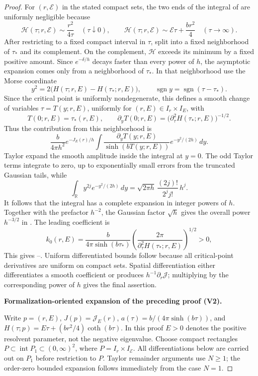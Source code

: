 \documentclass[11pt]{article}
\newcommand{\formalisationparentid}{X}
\newenvironment{formalisationaddition}[1]{\par\medskip\begingroup\color{blue}\def\formalisationparentid{#1}\setcounter{formalizationsublemma}{0}\let\lemma\formalizationsublemma\let\endlemma\endformalizationsublemma
  \def\Eo{\mathcal E_h^\circ}\def\EE{\mathcal E_h}\def\phio{\phi_h^\circ}\def\phih{\phi_h}\def\Ho{H_h^{\rm atom}(v^\circ)}\def\Ha{H_h^{\rm atom}}\def\HL{H_h^{L}}\def\Dh{D_h}\def\Log{\operatorname{Log}}\def\ellh{\ell_h}\def\Gp{G_{p,h}}\def\Ast{A_{*,h}}\def\ahat{\widehat{\mathfrak a}_h}\def\ah{\mathfrak a_h}\def\rh{\widehat\rho_h}\def\deltah{\widehat\delta_h}\def\oldref##1{\textup{(##1)}}\def\interface##1{\par\noindent\textit{Analytical interface used here.} ##1\par}\def\finish{\par\noindent\textit{Conclusion of the formalization-oriented expansion.} }\par\noindent\textbf{Formalization-oriented expansion of the preceding proof (V2).}\par\smallskip
}{\par\endgroup\medskip
}
\newcommand{\cE}{\mathcal E}
\newcommand{\cJ}{\mathcal J}
\begin{document}
\begin{proof}
For $(r,\cE)$ in the stated compact sets, the two ends of the integral {of } are uniformly negligible because
\[
 \mathcal H(\tau;r,\cE)\sim \frac{r^2}{4\tau}
 \quad (\tau\downarrow0),
 \qquad
 \mathcal H(\tau;r,\cE)\sim \cE\tau+\frac{br^2}{4}
 \quad (\tau\to\infty).
\]
After restricting to a fixed compact interval in $\tau$, split  into a fixed neighborhood of $\tau_*$ and its complement.  On the complement, $\mathcal H$ exceeds its minimum by a fixed positive amount.  Since $e^{-\delta/h}$ decays faster than every power of $h$, the asymptotic expansion comes only from a neighborhood of $\tau_*$.  In that neighborhood use the Morse coordinate
\[
    y^2=2\bigl(H(\tau;r,E)-H(\tau_*;r,E)\bigr),
    \qquad {\operatorname{sgn} y=\operatorname{sgn}(\tau-\tau_*)}.
\]
{ Since the critical point is uniformly nondegenerate, this defines a
smooth change of variables $\tau=T(y;r,E)$, uniformly for
$(r,E)\in I_r\times I_E$, with
\[
    T(0;r,E)=\tau_*(r,E),
    \qquad
    \partial_y T(0;r,E)
    =\bigl(\partial_\tau^2H(\tau_*;r,E)\bigr)^{-1/2}.
\]
Thus the contribution from this neighborhood is
\[
 \frac{b}{4\pi h^2}e^{-J_E(r)/h}
 \int
 \frac{\partial_yT(y;r,E)}
      {\sinh(bT(y;r,E))}
 e^{-y^2/(2h)}\,dy.
\]
Taylor expand the smooth amplitude inside the integral at  $y=0$.  The odd Taylor terms integrate to zero, up to exponentially
small errors from the truncated Gaussian tails, while
\[
 \int_{\mathbb R} y^{2j}e^{-y^2/(2h)}\,dy
 = \sqrt{2\pi h}\,\frac{(2j)!}{2^j j!}\,h^j.
\]
It follows that the integral has a complete expansion in integer powers
of $h$.  Together with the prefactor $h^{-2}$, the Gaussian factor
$\sqrt h$ gives the overall power $h^{-3/2}$ in .  The
leading coefficient is
\[
 k_0(r,E)
 =\frac{b}{4\pi\sinh(b\tau_*)}
   \left(
      \frac{2\pi}
           {\partial_\tau^2H(\tau_*;r,E)}
   \right)^{1/2}>0,
\]
This} gives --.  Uniform differentiated bounds follow because all critical-point derivatives are uniform on compact sets.  Spatial differentiation either differentiates a smooth coefficient or produces $h^{-1}\partial_r\cJ$; multiplying by the corresponding power of $h$ gives the final assertion.

\begin{formalisationaddition}{P2.3}
Write $p=(r,E)$, $J(p)=\cJ_E(r)$,
$a(\tau)=b/(4\pi\sinh(b\tau))$, and
$H(\tau;p)=E\tau+(br^2/4)\coth(b\tau)$. In this proof $E>0$ denotes the
positive resolvent parameter, not the negative eigenvalue. Choose compact
rectangles $P\subset\operatorname{int}P_1\subset(0,\infty)^2$, where
$P=I_r\times I_\cE$. All differentiations below are carried out on $P_1$
before restriction to $P$. Taylor remainder arguments use $N\ge1$;
the order-zero bounded expansion follows immediately from the case $N=1$.


\end{formalisationaddition}
\end{proof}
\end{document}
